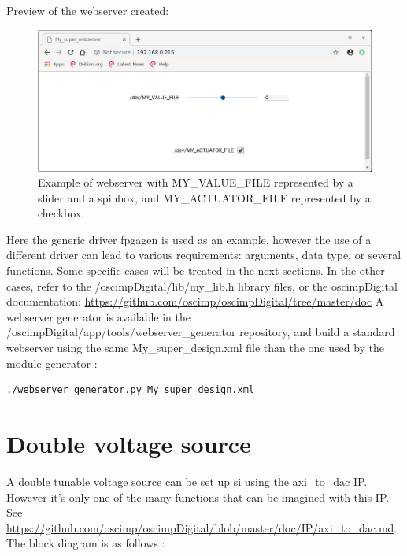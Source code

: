 \documentclass[12pt,oneside]{article}
\begin{document}
Preview of the webserver created:

\begin{figure}[h!tb]
	\begin{center}
		\includegraphics[width=15cm]{webserver/Super_webserver.png}
		\caption{Example of webserver with MY\_VALUE\_FILE represented by a slider and a spinbox, and MY\_ACTUATOR\_FILE represented by a checkbox.}
		\label{fig:superwebserver}
	\end{center}
\end{figure}

Here the generic driver fpgagen is used as an example, however the use of a different driver can lead to various requirements: arguments, data type, or several functions. Some specific cases will be treated in the next sections. In the other cases, refer to the /oscimpDigital/lib/my\_lib.h library files, or the oscimpDigital documentation: \href{[https://github.com/oscimp/oscimpDigital/tree/master/doc]}{https://github.com/oscimp/oscimpDigital/tree/master/doc}
\newline \newline
A webserver generator is available in the /oscimpDigital/app/tools/webserver\_generator repository, and build a standard webserver using the same My\_super\_design.xml file than the one used by the module generator :

 \begin{lstlisting}[language=bash]
./webserver_generator.py My_super_design.xml
 \end{lstlisting}

\section{Double voltage source}

A double tunable voltage source can be set up si using the axi\_to\_dac IP. However it's only one of the many functions that can be imagined with this IP. 
\newline See \href{[https://github.com/oscimp/oscimpDigital/blob/master/doc/IP/axi_to_dac.md]}{https://github.com/oscimp/oscimpDigital/blob/master/doc/IP/axi\_to\_dac.md}.
The block diagram is as follows :
\end{document}
